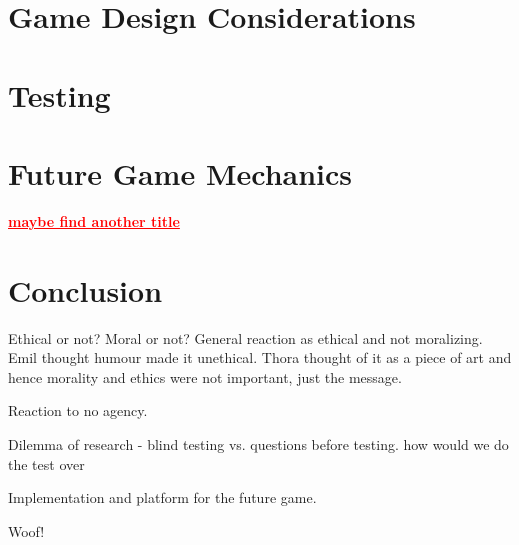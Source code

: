 \documentclass[preprint,12pt, authoryear]{elsarticle}
\newcommand\commenting[1]{\textcolor{red}{\textbf{\underline{#1}}}}
\begin{document}
\section{Game Design Considerations}
\label{Design}


\section{Testing}


\section{Future Game Mechanics}
\commenting{maybe find another title}
\label{Future}




\section{Conclusion}
Ethical or not?
Moral or not? General reaction as ethical and not moralizing. Emil thought humour made it unethical. Thora thought of it as a piece of art and hence morality and ethics were not important, just the message.\

Reaction to no agency. \

Dilemma of research - blind testing vs. questions before testing.
	how would we do the test over

Implementation and platform for the future game.\

Woof!\





\section*{\refname}



\



\end{document}
